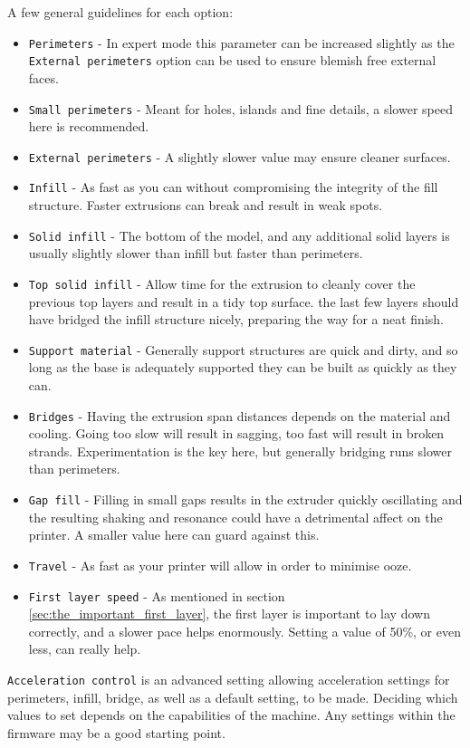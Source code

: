 A few general guidelines for each option:
\begin{itemize}
	\item \texttt{Perimeters}  - In expert mode this parameter can be increased slightly as the \texttt{External perimeters} option can be used to ensure blemish free external faces.
	\item \texttt{Small perimeters}  - Meant for holes, islands and fine details, a slower speed here is recommended.
	\item \texttt{External perimeters}  - A slightly slower value may ensure cleaner surfaces.
	\item \texttt{Infill}  - As fast as you can without compromising the integrity of the fill structure.  Faster extrusions can break and result in weak spots.
	\item \texttt{Solid infill}  - The bottom of the model, and any additional solid layers is usually slightly slower than infill but faster than perimeters.
	\item \texttt{Top solid infill}  - Allow time for the extrusion to cleanly cover the previous top layers and result in a tidy top surface.  the last few layers should have bridged the infill structure nicely, preparing the way for a neat finish. 
	\item \texttt{Support material}  - Generally support structures are quick and dirty, and so long as the base is adequately supported they can be built as quickly as they can.
	\item \texttt{Bridges}  - Having the extrusion span distances depends on the material and cooling.  Going too slow will result in sagging, too fast will result in broken strands.  Experimentation is the key here, but generally bridging runs slower than perimeters.
	\item \texttt{Gap fill}  - Filling in small gaps results in the extruder quickly oscillating and the resulting shaking and resonance could have a detrimental affect on the printer.  A smaller value here can guard against this. 
	\item \texttt{Travel}  - As fast as your printer will allow in order to minimise ooze.
	\item \texttt{First layer speed}  - As mentioned in section \ref{sec:the_important_first_layer}, the first layer is important to lay down correctly, and a slower pace helps enormously.  Setting a value of 50\%, or even less, can really help.
\end{itemize}

\texttt{Acceleration control} is an advanced setting allowing acceleration settings for perimeters, infill, bridge, as well as a default setting, to be made.  Deciding which values to set depends on the capabilities of the machine.  Any settings within the firmware may be a good starting point.

